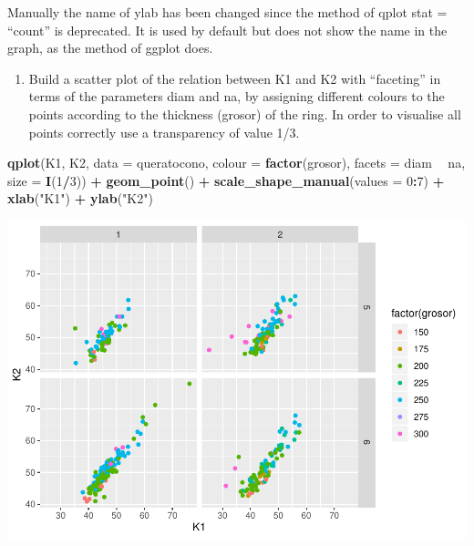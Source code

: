\documentclass[
]{article}
\newenvironment{Shaded}{\begin{snugshade}}{\end{snugshade}}
\newcommand{\DataTypeTok}[1]{\textcolor[rgb]{0.13,0.29,0.53}{#1}}
\newcommand{\DecValTok}[1]{\textcolor[rgb]{0.00,0.00,0.81}{#1}}
\newcommand{\KeywordTok}[1]{\textcolor[rgb]{0.13,0.29,0.53}{\textbf{#1}}}
\newcommand{\NormalTok}[1]{#1}
\newcommand{\OperatorTok}[1]{\textcolor[rgb]{0.81,0.36,0.00}{\textbf{#1}}}
\newcommand{\StringTok}[1]{\textcolor[rgb]{0.31,0.60,0.02}{#1}}
\providecommand{\tightlist}{%
  \setlength{\itemsep}{0pt}\setlength{\parskip}{0pt}}
\begin{document}
Manually the name of ylab has been changed since the method of qplot
stat = ``count'' is deprecated. It is used by default but does not show
the name in the graph, as the method of ggplot does.

\begin{enumerate}
\def\labelenumi{\arabic{enumi}.}
\setcounter{enumi}{4}
\tightlist
\item
  Build a scatter plot of the relation between K1 and K2 with
  ``faceting'' in terms of the parameters diam and na, by assigning
  different colours to the points according to the thickness (grosor) of
  the ring. In order to visualise all points correctly use a
  transparency of value 1/3.
\end{enumerate}

\begin{Shaded}
\begin{Highlighting}[]
\KeywordTok{qplot}\NormalTok{(K1, K2, }\DataTypeTok{data =}\NormalTok{ queratocono, }\DataTypeTok{colour =} \KeywordTok{factor}\NormalTok{(grosor), }\DataTypeTok{facets =}\NormalTok{ diam }\OperatorTok{~}\StringTok{ }\NormalTok{na, }
      \DataTypeTok{size =} \KeywordTok{I}\NormalTok{(}\DecValTok{1}\OperatorTok{/}\DecValTok{3}\NormalTok{)) }\OperatorTok{+}
\StringTok{      }\KeywordTok{geom_point}\NormalTok{() }\OperatorTok{+}\StringTok{ }
\StringTok{      }\KeywordTok{scale_shape_manual}\NormalTok{(}\DataTypeTok{values =} \DecValTok{0}\OperatorTok{:}\DecValTok{7}\NormalTok{) }\OperatorTok{+}
\StringTok{      }\KeywordTok{xlab}\NormalTok{(}\StringTok{"K1"}\NormalTok{) }\OperatorTok{+}\StringTok{ }\KeywordTok{ylab}\NormalTok{(}\StringTok{"K2"}\NormalTok{)}
\end{Highlighting}
\end{Shaded}

\includegraphics{document_files/figure-latex/unnamed-chunk-7-1.pdf}
\end{document}
